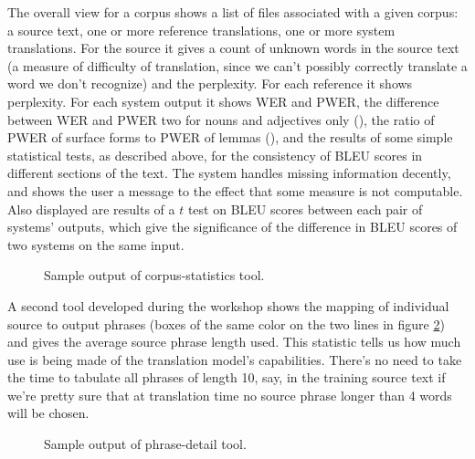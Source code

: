 \documentclass[10pt]{report}
\theoremstyle{plain}
\begin{document}
{The overall view for a corpus shows a list of files associated with a given corpus: a source text, one or more reference translations, one or more system translations. For the source it gives a count of unknown words in the source text (a measure of difficulty of translation, since we can't possibly correctly translate a word we don't recognize) and the perplexity. For each reference it shows perplexity. For each system output it shows WER and PWER, the difference between WER and PWER two for nouns and adjectives only (\cite{errMeasures}), the ratio of PWER of surface forms to PWER of lemmas (\cite{errMeasures}), and the results of some simple statistical tests, as described above, for the consistency of BLEU scores in different sections of the text. The system handles missing information decently, and shows the user a message to the effect that some measure is not computable. Also displayed are results of a $t$ test on BLEU scores between each pair of systems' outputs, which give the significance of the difference in BLEU scores of two systems on the same input.

\begin{figure}[h]
\centering
\caption{Sample output of corpus-statistics tool.}
\label{fig:sentence_by_sentence_screenshot}
\end{figure}

A second tool developed during the workshop shows the mapping of individual source to output phrases (boxes of the same color on the two lines in figure \ref{fig:phrases_used_screenshot}) and gives the average source phrase length used. This statistic tells us how much use is being made of the translation model's capabilities. There's no need to take the time to tabulate all phrases of length 10, say, in the training source text if we're pretty sure that at translation time no source phrase longer than 4 words will be chosen.

\begin{figure}[h]
\centering
\caption{Sample output of phrase-detail tool.}
\label{fig:phrases_used_screenshot}
\end{figure}

}
\end{document}

